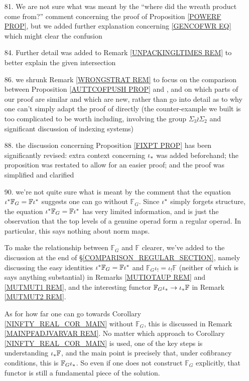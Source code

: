 \documentclass{article}
\begin{document}
\begin{itemize}
	\item[81.] We are not sure what was meant by the 
	``where did the wreath product come from?'' comment
	concerning the proof of Proposition \ref{POWERF PROP},
	but we added further explanation concerning
	\eqref{GENCOFWR EQ} which might clear the confusion
	
	\item[84.] Further detail was added 
	to Remark \ref{UNPACKINGLTIMES REM} to better explain the given intersection
	
	\item[86.] we shrunk Remark \ref{WRONGSTRAT REM} 
	to focus on the comparison between Proposition \ref{AUTTCOFPUSH PROP} and \cite[Lemma 5.9]{BM08},
	and on which parts of our proof are similar and which are new,
	rather than go into detail as to why one can't simply adapt the proof of \cite[Lemma 5.9]{BM08} directly
	(the counter-example we built 
	is too complicated to be worth including,
	involving the group 
	$\Sigma_3 \wr \Sigma_2$ and 
	significant discussion of indexing systems)	
	
	\item[88.] the discussion concerning Proposition \ref{FIXPT PROP} has been significantly revised: 
	extra context concerning $\iota_{\**}$ was added beforehand; the proposition was restated to allow for an easier proof; and the proof was simplified and clarified

	\item[90.]
	we're not quite sure what is meant by the comment that
	the equation 
	$\iota^{\**} \mathbb{F}_G = \mathbb{F} \iota^{\**}$
	suggests one can go without $\mathbb{F}_G$.
	Since $\iota^{\**}$ simply forgets structure, the equation 
	$\iota^{\**} \mathbb{F}_G = \mathbb{F} \iota^{\**}$
	has very limited information, and is just the observation that the top levels of a genuine operad form a regular operad. 
	In particular, this 
	says nothing about norm maps.
	
	To make the relationship between 
	$\mathbb{F}_G $ and $\mathbb{F}$
	clearer, we've added to the discussion at the end of 
	\S \ref{COMPARISON_REGULAR_SECTION},
	namely discussing the
	easy identities
	$\iota^{\**} \mathbb{F}_G = \mathbb{F} \iota^{\**}$
	and
	$\mathbb{F}_G \iota_! = \iota_! \mathbb{F}$
	(neither of which is says anything substantial)
	in Remarks \ref{MUTIOTAUP REM} and \ref{MUTMUT1 REM},
	and the interesting functor
	$\mathbb{F}_G \iota_{\**} \to \iota_{\**} \mathbb{F}$
	in Remark \ref{MUTMUT2 REM}.
	
	As for how far one can go towards
	Corollary \ref{NINFTY_REAL_COR_MAIN}
	without $\mathbb{F}_G$,
	this is discussed in Remark \ref{MAINPFADJVARVAR REM}.
	No matter which approach to Corollary \ref{NINFTY_REAL_COR_MAIN} is used, 
	one of the key steps is understanding 
	$\iota_{\**} \mathbb{F}$,
	and the main point is precisely that, under cofibrancy conditions,
	this is $\mathbb{F}_G \iota_{\**}$.
	So even if one does not construct $\mathbb{F}_G$ explicitly,
	that functor is still a fundamental piece of the solution.
	

\end{itemize}
\end{document}
